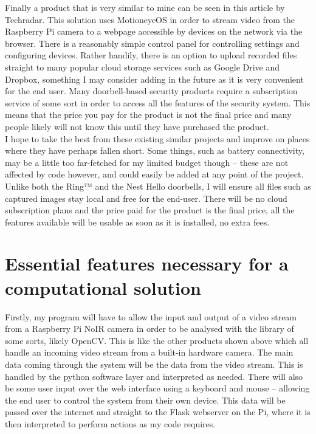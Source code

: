\documentclass[9pt]{article}
\begin{document}
Finally a product that is very similar to mine can be seen in this article by Techradar. This solution uses MotioneyeOS in order to stream video from the Raspberry Pi camera to a webpage accessible by devices on the network via the browser. There is a reasonably simple control panel for controlling settings and configuring devices. Rather handily, there is an option to upload recorded files straight to many popular cloud storage services such as Google Drive and Dropbox, something I may consider adding in the future as it is very convenient for the end user.
Many doorbell-based security products require a subscription service of some sort in order to access all the features of the security system. This means that the price you pay for the product is not the final price and many people likely will not know this until they have purchased the product. \\
I hope to take the best from these existing similar projects and improve on places where they have perhaps fallen short. Some things, such as battery connectivity, may be a little too far-fetched for my limited budget though – these are not affected by code however, and could easily be added at any point of the project. Unlike both the Ring™ and the Nest Hello doorbells, I will ensure all files such as captured images stay local and free for the end-user. There will be no cloud subscription plans and the price paid for the product is the final price, all the features available will be usable as soon as it is installed, no extra fees.

\section{Essential features necessary for a computational solution}\label{sec_essential}
Firstly, my program will have to allow the input and output of a video stream from a Raspberry Pi NoIR camera in order to be analysed with the library of some sorts, likely OpenCV. This is like the other products shown above which all handle an incoming video stream from a built-in hardware camera. The main data coming through the system will be the data from the video stream. This is handled by the python software layer and interpreted as needed. There will also be some user input over the web interface using a keyboard and mouse – allowing the end user to control the system from their own device. This data will be passed over the internet and straight to the Flask webserver on the Pi, where it is then interpreted to perform actions as my code requires.
\end{document}
